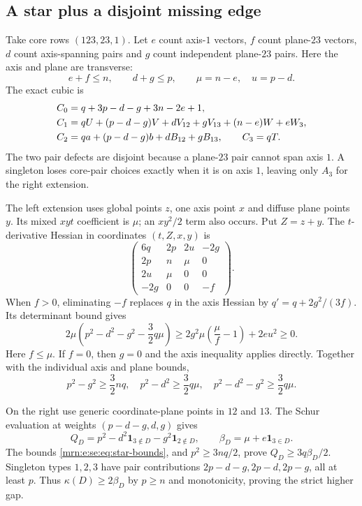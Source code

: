 \documentclass[11pt,a4paper]{article}
\theoremstyle{remark}\newtheorem{remark}[theorem]{Remark}
\newcommand{\ind}{\mathbf1}                %
\begin{document}
\subsection{A star plus a disjoint missing edge}
Take core rows $(123,23,1)$. Let $e$ count axis-$1$ vectors, $f$ count plane-$23$ vectors, $d$ count axis-spanning pairs and $g$ count independent plane-$23$ pairs. Here the axis and plane are transverse:
\[
 e+f\le n,\qquad d+g\le p,\qquad \mu=n-e,\quad u=p-d.
\]
The exact cubic is
\begin{align}
 C_0&=q+3p-d-g+3n-2e+1,\label{mrn:e:se:eq:star}\\
 C_1&=qU+(p-d-g)V+dV_{12}+gV_{13}
                +(n-e)W+eW_3,\notag\\
 C_2&=qa+(p-d-g)b+dB_{12}+gB_{13},\qquad C_3=qT.\notag
\end{align}
The two pair defects are disjoint because a plane-$23$ pair cannot span axis $1$. A singleton loses core-pair choices exactly when it is on axis $1$, leaving only $A_3$ for the right extension.

The left extension uses global points $z$, one axis point $x$ and diffuse plane points $y$. Its mixed $xyt$ coefficient is $\mu$; an $xy^2/2$ term also occurs. Put $Z=z+y$. The $t$-derivative Hessian in coordinates $(t,Z,x,y)$ is
\[
 \begin{pmatrix}
 6q&2p&2u&-2g\\
 2p&n&\mu&0\\
 2u&\mu&0&0\\
 -2g&0&0&-f
 \end{pmatrix}.
\]
When $f>0$, eliminating $-f$ replaces $q$ in the axis Hessian by
$q'=q+2g^2/(3f)$. Its determinant bound gives
\[
 2\mu\left(p^2-d^2-g^2-\frac32q\mu\right)
 \ge2g^2\mu\left(\frac{\mu}{f}-1\right)+2eu^2\ge0.
\]
Here $f\le\mu$. If $f=0$, then $g=0$ and the axis inequality applies directly. Together with the individual axis and plane bounds,
\begin{equation}\label{mrn:e:se:eq:star-bounds}
 p^2-g^2\ge\frac32nq,\quad
 p^2-d^2\ge\frac32q\mu,\quad
 p^2-d^2-g^2\ge\frac32q\mu.
\end{equation}

On the right use generic coordinate-plane points in $12$ and $13$. The Schur evaluation at weights $(p-d-g,d,g)$ gives
\[
 Q_D=p^2-d^2\ind_{3\notin D}-g^2\ind_{2\notin D},
 \qquad \beta_D=\mu+e\ind_{3\in D}.
\]
The bounds \eqref{mrn:e:se:eq:star-bounds}, and $p^2\ge3nq/2$, prove
$Q_D\ge3q\beta_D/2$. Singleton types $1,2,3$ have pair contributions
$2p-d-g,2p-d,2p-g$, all at least $p$. Thus $\kappa(D)\ge2\beta_D$ by $p\ge n$ and monotonicity, proving the strict higher gap.
\end{document}

